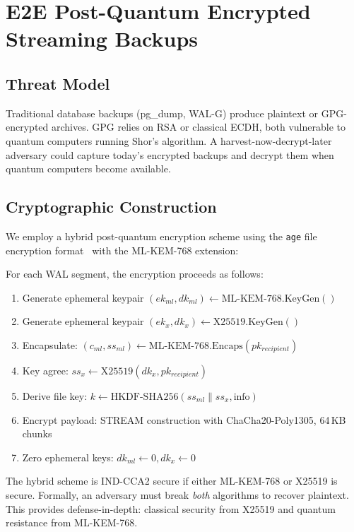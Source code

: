 \section{E2E Post-Quantum Encrypted Streaming Backups}


\subsection{Threat Model}

Traditional database backups (pg\_dump, WAL-G) produce plaintext or GPG-encrypted archives.
GPG relies on RSA or classical ECDH, both vulnerable to quantum computers running Shor's
algorithm. A harvest-now-decrypt-later adversary could capture today's encrypted backups
and decrypt them when quantum computers become available.

\subsection{Cryptographic Construction}

We employ a hybrid post-quantum encryption scheme using the \texttt{age} file encryption
format~\cite{age} with the ML-KEM-768 extension:

\begin{definition}
For each WAL segment, the encryption proceeds as follows:
\begin{enumerate}
  \item Generate ephemeral keypair $(ek_{ml}, dk_{ml}) \leftarrow \text{ML-KEM-768.KeyGen}()$
  \item Generate ephemeral keypair $(ek_{x}, dk_{x}) \leftarrow \text{X25519.KeyGen}()$
  \item Encapsulate: $(c_{ml}, ss_{ml}) \leftarrow \text{ML-KEM-768.Encaps}(pk_{recipient})$
  \item Key agree: $ss_{x} \leftarrow \text{X25519}(dk_{x}, pk_{recipient})$
  \item Derive file key: $k \leftarrow \text{HKDF-SHA256}(ss_{ml} \| ss_{x}, \text{info})$
  \item Encrypt payload: STREAM construction with ChaCha20-Poly1305, 64\,KB chunks
  \item Zero ephemeral keys: $dk_{ml} \leftarrow 0, dk_{x} \leftarrow 0$
\end{enumerate}
\end{definition}

\begin{proposition}[Security]
The hybrid scheme is IND-CCA2 secure if either ML-KEM-768 or X25519 is secure. Formally,
an adversary must break \emph{both} algorithms to recover plaintext. This provides
defense-in-depth: classical security from X25519 and quantum resistance from ML-KEM-768.
\end{proposition}

